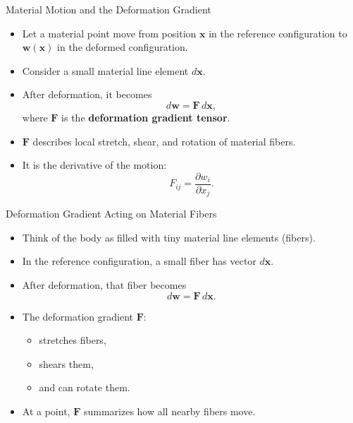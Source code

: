 \documentclass[aspectratio=169,11pt]{beamer}
\begin{document}
\begin{frame}{Material Motion and the Deformation Gradient}

\begin{itemize}

\item Let a material point move from position $\mathbf{x}$ in the reference configuration to $\mathbf{w}(\mathbf{x})$ in the deformed configuration.
\item Consider a small material line element $d\mathbf{x}$.
\item After deformation, it becomes
\[
d\mathbf{w} = \mathbf{F}\,d\mathbf{x},
\]
where $\mathbf{F}$ is the \textbf{deformation gradient tensor}.

\item $\mathbf{F}$ describes local stretch, shear, and rotation of material fibers.
\item It is the derivative of the motion:
\[
F_{ij} = \frac{\partial w_i}{\partial x_j}.
\]

\end{itemize}

\end{frame}

\begin{frame}{Deformation Gradient Acting on Material Fibers}

\begin{itemize}
    \item Think of the body as filled with tiny material line elements (fibers).
    \item In the reference configuration, a small fiber has vector
          $d\mathbf{x}$.
    \item After deformation, that fiber becomes
          \[
              d\mathbf{w} = \mathbf{F}\,d\mathbf{x}.
          \]
    \item The deformation gradient $\mathbf{F}$:
          \begin{itemize}
              \item stretches fibers,
              \item shears them,
              \item and can rotate them.
          \end{itemize}
    \item At a point, $\mathbf{F}$ summarizes how all nearby fibers move.
\end{itemize}

\vspace{0.3cm}



\end{frame}
\end{document}

